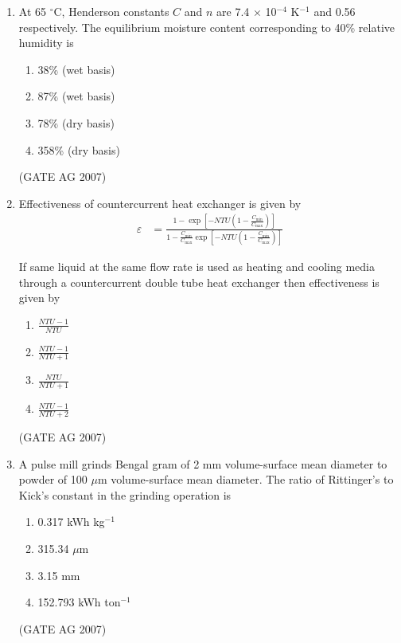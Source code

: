 \documentclass[journal,12pt,onecolumn]{IEEEtran}
\theoremstyle{remark}
\begin{document}
\begin{enumerate}
\item  At 65 $^{\circ}$C, Henderson constants $C$ and $n$ are 7.4 $\times$ 10$^{-4}$ K$^{-1}$ and 0.56 respectively. The equilibrium moisture content corresponding to 40\% relative humidity is
\begin{multicols}{4}
\begin{enumerate}
    \item 38\% (wet basis)
    \item 87\% (wet basis)
    \item 78\% (dry basis)
    \item 358\% (dry basis)
\end{enumerate}
\end{multicols}
\hfill(GATE AG 2007)

\item  Effectiveness of countercurrent heat exchanger is given by
\begin{align*}
\varepsilon &= 
\frac{1 - \exp\left[-NTU\left(1 - \frac{C_{\min}}{C_{\max}}\right)\right]}
{1 - \frac{C_{\min}}{C_{\max}} 
\exp\left[-NTU\left(1 - \frac{C_{\min}}{C_{\max}}\right)\right]}
\end{align*}

If same liquid at the same flow rate is used as heating and cooling media through a countercurrent double tube heat exchanger then effectiveness is given by
\begin{multicols}{2}
\begin{enumerate}
    \item  $\frac{NTU - 1}{NTU}$
    
    \item $\frac{NTU - 1}{NTU+1}$
    \item $\frac{NTU}{NTU+1}$
    
    \item $\frac{NTU - 1}{NTU+2}$
\end{enumerate}
\end{multicols}
\hfill(GATE AG 2007)

\item  A pulse mill grinds Bengal gram of 2 mm volume-surface mean diameter to powder of 100 $\mu$m volume-surface mean diameter. The ratio of Rittinger's to Kick's constant in the grinding operation is
\begin{multicols}{4}
\begin{enumerate}
    \item 0.317 kWh kg$^{-1}$
    \item 315.34 $\mu$m
    \item 3.15 mm
    \item 152.793 kWh ton$^{-1}$
\end{enumerate}
\end{multicols}
\hfill(GATE AG 2007)


\end{enumerate}
\end{document}
